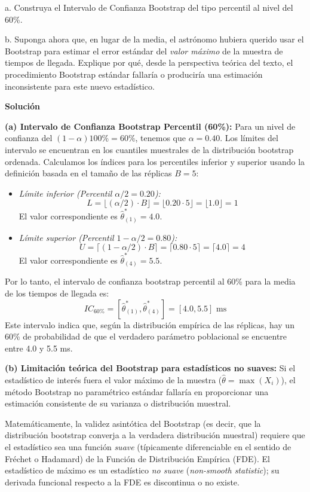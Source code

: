 \documentclass[a4paper]{article}
\begin{document}
a. Construya el Intervalo de Confianza Bootstrap del tipo percentil al nivel del 60\%. 

b. Suponga ahora que, en lugar de la media, el astrónomo hubiera querido usar el Bootstrap para estimar el error estándar del \textit{valor máximo} de la muestra de tiempos de llegada. Explique por qué, desde la perspectiva teórica del texto, el procedimiento Bootstrap estándar fallaría o produciría una estimación inconsistente para este nuevo estadístico.

\textbf{Solución}

\textbf{(a) Intervalo de Confianza Bootstrap Percentil (60\%):}
Para un nivel de confianza del $(1-\alpha)100\% = 60\%$, tenemos que $\alpha = 0.40$. Los límites del intervalo se encuentran en los cuantiles muestrales de la distribución bootstrap ordenada.
Calculamos los índices para los percentiles inferior y superior usando la definición basada en el tamaño de las réplicas $B=5$:
\begin{itemize}
    \item \textit{Límite inferior (Percentil $\alpha/2 = 0.20$):} 
    $$ L = \lfloor (\alpha/2) \cdot B \rfloor = \lfloor 0.20 \cdot 5 \rfloor = \lfloor 1.0 \rfloor = 1 $$
    El valor correspondiente es $\hat{\theta}^*_{(1)} = 4.0$.
    
    \item \textit{Límite superior (Percentil $1-\alpha/2 = 0.80$):} 
    $$ U = \lceil (1-\alpha/2) \cdot B \rceil = \lceil 0.80 \cdot 5 \rceil = \lceil 4.0 \rceil = 4 $$
    El valor correspondiente es $\hat{\theta}^*_{(4)} = 5.5$.
\end{itemize}
Por lo tanto, el intervalo de confianza bootstrap percentil al 60\% para la media de los tiempos de llegada es:
$$ IC_{60\%} = [\hat{\theta}^*_{(1)}, \hat{\theta}^*_{(4)}] = [4.0, 5.5] \text{ ms} $$
Este intervalo indica que, según la distribución empírica de las réplicas, hay un 60\% de probabilidad de que el verdadero parámetro poblacional se encuentre entre 4.0 y 5.5 ms.

\textbf{(b) Limitación teórica del Bootstrap para estadísticos no suaves:}
Si el estadístico de interés fuera el valor máximo de la muestra ($\hat{\theta} = \max(X_i)$), el método Bootstrap no paramétrico estándar fallaría en proporcionar una estimación consistente de su varianza o distribución muestral. 

Matemáticamente, la validez asintótica del Bootstrap (es decir, que la distribución bootstrap converja a la verdadera distribución muestral) requiere que el estadístico sea una función \textit{suave} (típicamente diferenciable en el sentido de Fréchet o Hadamard) de la Función de Distribución Empírica (FDE). El estadístico de máximo es un estadístico \textit{no suave} (\textit{non-smooth statistic}); su derivada funcional respecto a la FDE es discontinua o no existe. 
\end{document}
